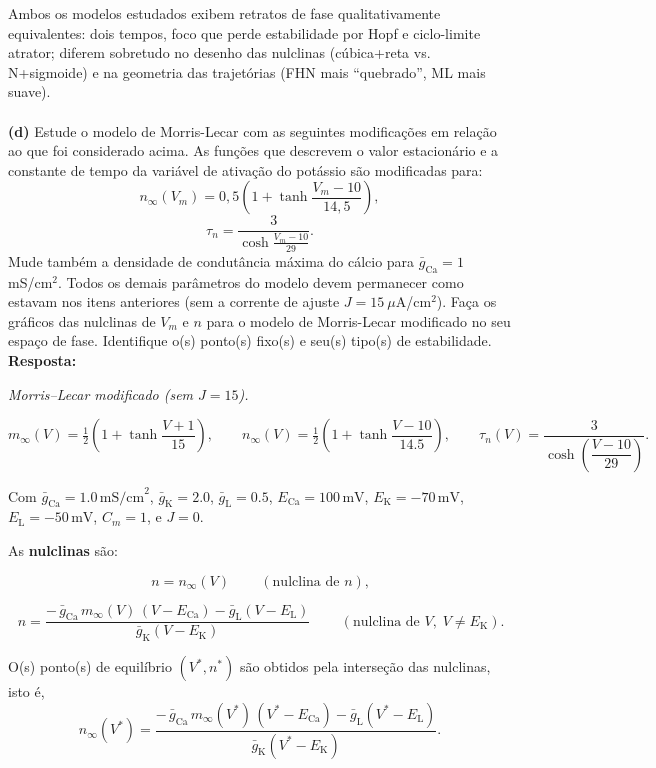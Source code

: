 \documentclass[english,11pt,a4paper]{article}
\begin{document}
	
	
	
	Ambos os modelos estudados exibem retratos de fase qualitativamente equivalentes: dois tempos, foco que perde estabilidade por Hopf e ciclo-limite atrator; diferem sobretudo no desenho das nulclinas (cúbica+reta vs. N+sigmoide) e na geometria das trajetórias (FHN mais “quebrado”, ML mais suave).\\\\
	
	
	\noindent\textbf{(d)} Estude o modelo de Morris-Lecar com as seguintes modificações em relação ao que foi considerado acima. As funções que descrevem o valor estacionário e a constante de tempo da variável de ativação do potássio são modificadas para:
	\[
	n_{\infty}(V_m) = 0{,}5 \left( 1 + \tanh \frac{V_m - 10}{14{,}5} \right),
	\]
	\[
	\tau_n = \frac{3}{\cosh \frac{V_m - 10}{29}}.
	\]
	Mude também a densidade de condutância máxima do cálcio para $\bar{g}_{\text{Ca}} = 1$ mS/cm$^2$. Todos os demais parâmetros do modelo devem permanecer como estavam nos itens anteriores (sem a corrente de ajuste $J = 15~\mu$A/cm$^2$). Faça os gráficos das nulclinas de $V_m$ e $n$ para o modelo de Morris-Lecar modificado no seu espaço de fase. Identifique o(s) ponto(s) fixo(s) e seu(s) tipo(s) de estabilidade.\\
	
	\noindent\textbf{Resposta:}
	
	\noindent\textit{Morris–Lecar modificado (sem $J=15$).}
	
	\[
	m_\infty(V)=\tfrac12\!\left(1+\tanh\dfrac{V+1}{15}\right),\qquad
	n_\infty(V)=\tfrac12\!\left(1+\tanh\dfrac{V-10}{14.5}\right),\qquad
	\tau_n(V)=\dfrac{3}{\cosh\!\left(\dfrac{V-10}{29}\right)}.
	\]
	
	Com \( \bar g_{\mathrm{Ca}}=1.0\,\mathrm{mS/cm}^2\), \( \bar g_{\mathrm K}=2.0\), \( \bar g_{\mathrm L}=0.5\),
	\(E_{\mathrm{Ca}}=100\,\mathrm{mV}\), \(E_{\mathrm K}=-70\,\mathrm{mV}\), \(E_{\mathrm L}=-50\,\mathrm{mV}\), \(C_m=1\), e \(J=0\).
	
	As \textbf{nulclinas} são:
	
	\[
	\boxed{\, n=n_\infty(V) \,}\qquad(\text{nulclina de }n),
	\]
	
	\[
	\boxed{\, n=\dfrac{-\,\bar g_{\mathrm{Ca}}\,m_\infty(V)\,(V-E_{\mathrm{Ca}})
			-\bar g_{\mathrm L}(V-E_{\mathrm L})}{\bar g_{\mathrm K}(V-E_{\mathrm K})} \,}\qquad(\text{nulclina de }V,\;V\neq E_{\mathrm K}).
	\]
	
	\noindent O(s) ponto(s) de equilíbrio $(V^*,n^*)$ são obtidos pela interseção das nulclinas, isto é,
	\[
	n_\infty(V^*) = \dfrac{-\,\bar g_{\mathrm{Ca}}\,m_\infty(V^*)\,(V^*-E_{\mathrm{Ca}})
		-\bar g_{\mathrm L}(V^*-E_{\mathrm L})}{\bar g_{\mathrm K}(V^*-E_{\mathrm K})}.
	\]
	
\end{document}
